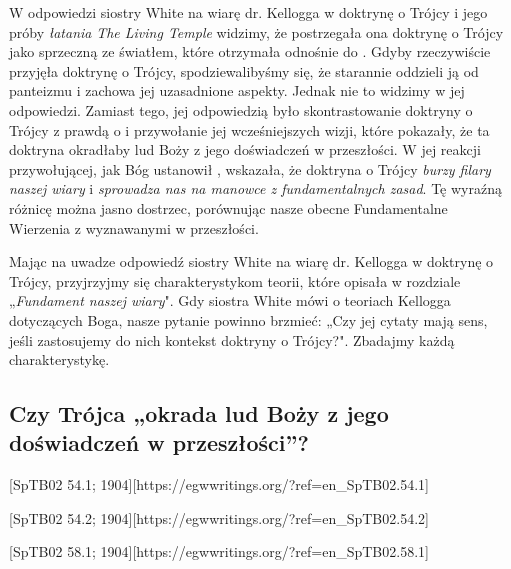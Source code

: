 
W odpowiedzi siostry White na wiarę dr. Kellogga w doktrynę o Trójcy i jego próby \textit{łatania} \textit{The Living Temple} widzimy, że postrzegała ona doktrynę o Trójcy jako sprzeczną ze światłem, które otrzymała odnośnie do . Gdyby rzeczywiście przyjęła doktrynę o Trójcy, spodziewalibyśmy się, że starannie oddzieli ją od panteizmu i zachowa jej uzasadnione aspekty. Jednak nie to widzimy w jej odpowiedzi. Zamiast tego, jej odpowiedzią było skontrastowanie doktryny o Trójcy z prawdą o  i przywołanie jej wcześniejszych wizji, które pokazały, że ta doktryna okradłaby lud Boży z jego doświadczeń w przeszłości. W jej reakcji przywołującej, jak Bóg ustanowił , wskazała, że doktryna o Trójcy \textit{burzy filary naszej wiary} i \textit{sprowadza nas na manowce z fundamentalnych zasad}. Tę wyraźną różnicę można jasno dostrzec, porównując nasze obecne Fundamentalne Wierzenia z  wyznawanymi w przeszłości.

Mając na uwadze odpowiedź siostry White na wiarę dr. Kellogga w doktrynę o Trójcy, przyjrzyjmy się charakterystykom teorii, które opisała w rozdziale „\textit{Fundament naszej wiary}". Gdy siostra White mówi o teoriach Kellogga dotyczących Boga, nasze pytanie powinno brzmieć: „Czy jej cytaty mają sens, jeśli zastosujemy do nich kontekst doktryny o Trójcy?". Zbadajmy każdą charakterystykę.

\subsection*{Czy Trójca „okrada lud Boży z jego doświadczeń w przeszłości”?}

[SpTB02 54.1; 1904][https://egwwritings.org/?ref=en\_SpTB02.54.1]

[SpTB02 54.2; 1904][https://egwwritings.org/?ref=en\_SpTB02.54.2]

[SpTB02 58.1; 1904][https://egwwritings.org/?ref=en\_SpTB02.58.1]

